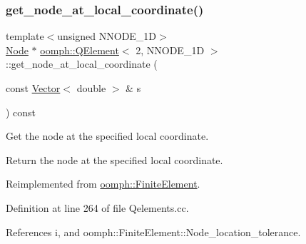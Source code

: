 \mbox{\label{classoomph_1_1QElement_3_012_00_01NNODE__1D_01_4_ac001c0655ddfb205069e1541d10f59b1}} 
\subsubsection{\texorpdfstring{get\+\_\+node\+\_\+at\+\_\+local\+\_\+coordinate()}{get\_node\_at\_local\_coordinate()}}
{\footnotesize\ttfamily template$<$unsigned N\+N\+O\+D\+E\+\_\+1D$>$ \\
\hyperlink{classoomph_1_1Node}{Node} $\ast$ \hyperlink{classoomph_1_1QElement}{oomph\+::\+Q\+Element}$<$ 2, N\+N\+O\+D\+E\+\_\+1D $>$\+::get\+\_\+node\+\_\+at\+\_\+local\+\_\+coordinate (\begin{DoxyParamCaption}\item[{const \hyperlink{classoomph_1_1Vector}{Vector}$<$ double $>$ \&}]{s }\end{DoxyParamCaption}) const\hspace{0.3cm}{\ttfamily [virtual]}}



Get the node at the specified local coordinate. 

Return the node at the specified local coordinate. 

Reimplemented from \hyperlink{classoomph_1_1FiniteElement_a2ddbb05c5f8bb35b64bec287d653105c}{oomph\+::\+Finite\+Element}.



Definition at line 264 of file Qelements.\+cc.



References i, and oomph\+::\+Finite\+Element\+::\+Node\+\_\+location\+\_\+tolerance.

\mbox{\label{classoomph_1_1QElement_3_012_00_01NNODE__1D_01_4_a7abbf874d0f96b26d2f6c337dc7f4526}} 
